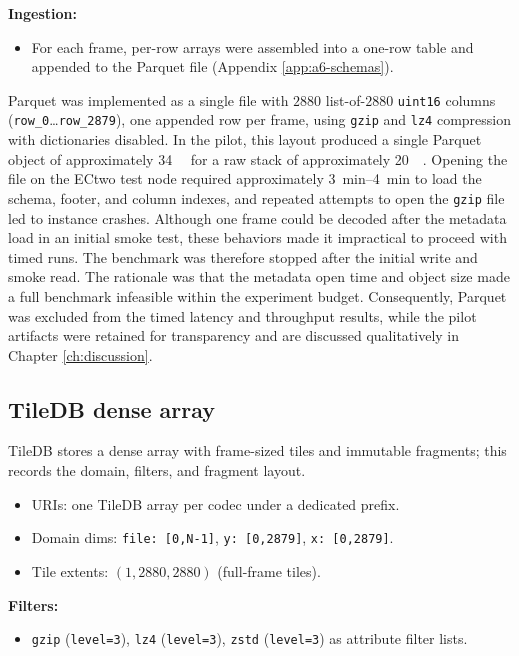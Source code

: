 \documentclass[nomenclature, english, bibtex]{kththesis}
\numberwithin{listing}{chapter}
\begin{document}
\textbf{Ingestion:}
\begin{itemize}
  \item For each frame, per-row arrays were assembled into a one-row table and appended to the Parquet file (Appendix \ref{app:a6-schemas}).
\end{itemize}

Parquet was implemented as a single file with $2880$ list-of-$2880$ \texttt{uint16} columns (\texttt{row\_0}\dots\texttt{row\_2879}), one appended row per frame, using \texttt{gzip} and \texttt{lz4} compression with dictionaries disabled. In the pilot, this layout produced a single Parquet object of approximately \SI{34}{\gibi\byte} for a raw stack of approximately \SI{20}{\gibi\byte}. Opening the file on the \gls{ECtwo} test node required approximately \SIrange{3}{4}{\minute} to load the schema, footer, and column indexes, and repeated attempts to open the \texttt{gzip} file led to instance crashes. Although one frame could be decoded after the metadata load in an initial smoke test, these behaviors made it impractical to proceed with timed runs. The benchmark was therefore stopped after the initial write and smoke read. The rationale was that the metadata open time and object size made a full benchmark infeasible within the experiment budget. Consequently, Parquet was excluded from the timed latency and throughput results, while the pilot artifacts were retained for transparency and are discussed qualitatively in Chapter \ref{ch:discussion}.

\subsection{TileDB dense array} TileDB stores a dense array with frame-sized tiles and immutable fragments; this records the domain, filters, and fragment layout.

\begin{itemize}
  \item URIs: one TileDB array per codec under a dedicated prefix.
  \item Domain dims: \texttt{file: [0,N-1]}, \texttt{y: [0,2879]}, \texttt{x: [0,2879]}.
  \item Tile extents: $(1,2880,2880)$ (full-frame tiles).
\end{itemize}

\textbf{Filters:}
\begin{itemize}
  \item \texttt{gzip} (\texttt{level=3}), \texttt{lz4} (\texttt{level=3}), \texttt{zstd} (\texttt{level=3}) as attribute filter lists.
\end{itemize}
\end{document}

